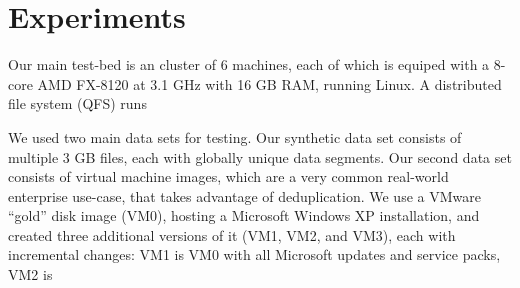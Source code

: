 \section{Experiments}
Our main test-bed is an cluster of 6 machines,
each of which is equiped with a 8-core AMD FX-8120 at 3.1 GHz
with 16 GB RAM, running Linux. 
A distributed file system (QFS) runs

We used two main data sets for testing. Our synthetic
data set consists of multiple 3 GB files, each with globally
unique data segments. Our second data set consists
of virtual machine images, which are a very common
real-world enterprise use-case, that takes advantage
of deduplication. We use a VMware “gold” disk image
(VM0), hosting a Microsoft Windows XP installation,
and created three additional versions of it (VM1, VM2,
and VM3), each with incremental changes: VM1 is VM0
with all Microsoft updates and service packs, VM2 is